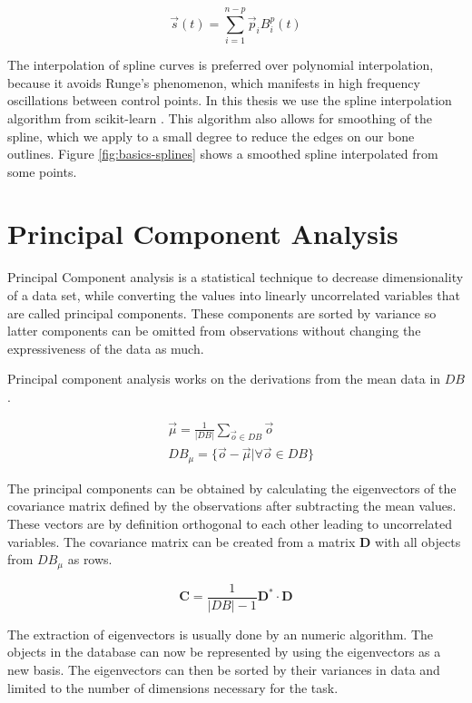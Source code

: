 \documentclass[pdftex,12pt,a4paper]{report}
\begin{document}
\begin{equation}
\vec{s}(t) =  \sum_{i=1}^{n-p} \vec{p}_i B_i^p(t)
\end{equation}

The interpolation of spline curves is preferred over polynomial interpolation, because it avoids Runge's phenomenon, which manifests in high frequency oscillations between control points. In this thesis we use the spline interpolation algorithm from scikit-learn \cite{pedregosa2011scikit}. This algorithm also allows for smoothing of the spline, which we apply to a small degree to reduce the edges on our bone outlines. Figure \ref{fig:basics-splines} shows a smoothed spline interpolated from some points.

\section{Principal Component Analysis}

Principal Component analysis is a statistical technique to decrease dimensionality of a data set, while converting the values into linearly uncorrelated variables that are called principal components. These components are sorted by variance so latter components can be omitted from observations without changing the expressiveness of the data as much.

Principal component analysis works on the derivations from the mean data in $DB$.

\begin{equation}
\begin{split}
& \vec{\mu} = \frac{1}{|DB|} \sum_{\vec{o} \in DB}  \vec{o} \\
& DB_\mu = \{ \vec{o} - \vec{\mu} | \forall \vec{o} \in DB \}
\end{split}
\end{equation}

The principal components can be obtained by calculating the eigenvectors of the covariance matrix defined by the observations after subtracting the mean values. These vectors are by definition orthogonal to each other leading to uncorrelated variables. The covariance matrix can  be created from a matrix $\mathbf{D}$ with all objects from $DB_\mu$ as rows.

\begin{equation}
\mathbf{C} = \frac{1}{|DB|-1} \mathbf{D}^* \cdot \mathbf{D}
\end{equation}

The extraction of eigenvectors is usually done by an numeric algorithm. The objects in the database can now be represented by using the eigenvectors as a new basis. The eigenvectors can then be sorted by their variances in data and limited to the number of dimensions necessary for the task.
\end{document}
